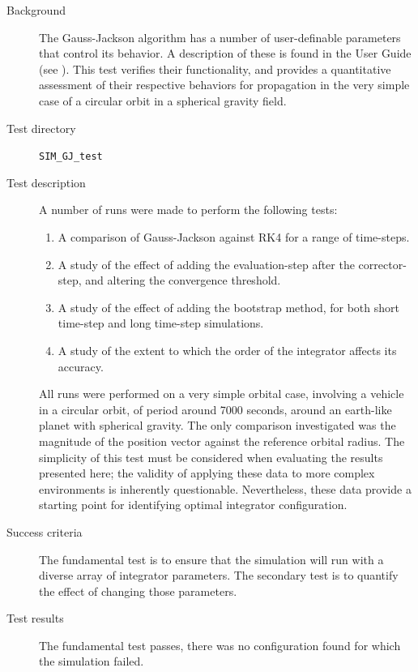 \label{test:gauss_jackson}
\begin{description}
 \item [Background]
The Gauss-Jackson algorithm has a number of user-definable parameters that 
control its behavior.  A description of these is found in the User Guide (see 
).  This test verifies 
their functionality, and provides a quantitative assessment of their 
respective behaviors for propagation in the very simple case of a circular 
orbit in a spherical gravity field.

\item [Test directory] {\tt SIM\_GJ\_test} \\

\item[Test description]
A number of runs were made to perform the following tests:
\begin{enumerate}
 \item A comparison of Gauss-Jackson against RK4 for a range of time-steps.
 \item A study of the effect of adding the evaluation-step after the 
 corrector-step, and altering the convergence threshold.
 \item A study of the effect of adding the bootstrap method, for both short 
 time-step and long time-step simulations.
 \item A study of the extent to which the order of the integrator affects its 
 accuracy. 
\end{enumerate}

All runs were performed on a very simple orbital case, involving a vehicle in 
a circular orbit, of period around 7000 seconds, around an earth-like planet 
with spherical gravity.  The only comparison investigated was the magnitude of 
the position vector against the reference orbital radius.
The simplicity of this test must be considered when 
evaluating the results presented here; the validity of applying these data to 
more complex environments is inherently questionable.  Nevertheless, these 
data provide a starting point for identifying optimal integrator 
configuration.

\item[Success criteria]
The fundamental test is to ensure that the simulation will run with a diverse 
array of integrator parameters.  The secondary test is to quantify the effect 
of changing those parameters.

\item[Test results]
The fundamental test passes, there was no configuration found for which the 
simulation failed.


\end{description}
